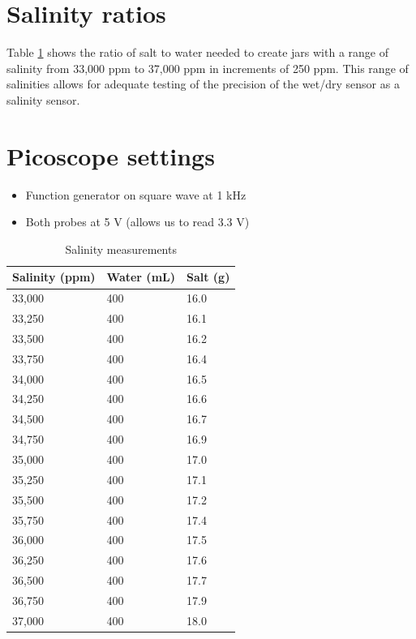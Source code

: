 \documentclass[twocolumn]{article}
\begin{document}
\section {Salinity ratios}
Table \ref{tab:salinity_measurements} shows the ratio of salt to water needed to create jars with a range of salinity from 33,000 ppm to 37,000 ppm in increments of 250 ppm. This range of salinities allows for adequate testing of the precision of the wet/dry sensor as a salinity sensor.


\section{Picoscope settings}
\begin{itemize}
    \item Function generator on square wave at 1 kHz
    \item Both probes at 5 V (allows us to read 3.3 V)
\end{itemize}

\begin{table}[ht]
    \caption{Salinity measurements}
    \centering
    \begin{tabular}{lll}
        \hline
        Salinity (ppm) & Water (mL) & Salt (g) \\ \hline
        33,000         & 400               & 16.0             \\
        33,250         & 400               & 16.1             \\
        33,500         & 400               & 16.2             \\
        33,750         & 400               & 16.4             \\
        34,000         & 400               & 16.5             \\
        34,250         & 400               & 16.6             \\
        34,500         & 400               & 16.7             \\
        34,750         & 400               & 16.9             \\
        35,000         & 400               & 17.0             \\
        35,250         & 400               & 17.1             \\
        35,500         & 400               & 17.2             \\
        35,750         & 400               & 17.4             \\
        36,000         & 400               & 17.5             \\
        36,250         & 400               & 17.6             \\
        36,500         & 400               & 17.7             \\
        36,750         & 400               & 17.9             \\
        37,000         & 400               & 18.0             \\ \hline
    \end{tabular}
    \label{tab:salinity_measurements}
\end{table}
\end{document}
